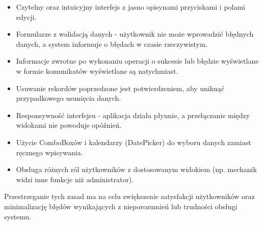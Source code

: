 \begin{itemize}
    \item Czytelny oraz intuicyjny interfejs z jasno opisynami przyciskami i polami edycji.
    \item Formularze z walidacją danych - użytkownik nie może wprowadzić błędnych danych, a system informuje o błędach w czasie rzeczywistym.
    \item Informacje zwrotne po wykonaniu operacji o sukcesie lub błędzie wyświetlane w formie komunikatów wyświetlane są natychmiast.
    \item Usuwanie rekordów poprzedzone jest potwierdzeniem, aby uniknąć przypadkowego usunięcia danych.
    \item Responsywność interfejsu - aplikacja działa płynnie, a przełączanie między widokami nie powoduje opóźnień.
    \item Użycie ComboBoxów i kalendarzy (DatePicker) do wyboru danych zamiast ręcznego wpisywania.
    \item Obsługa różnych ról użytkowników z dostosowanym widokiem (np. mechanik widzi inne funkcje niż administrator).
\end{itemize}

Przestrzeganie tych zasad ma na celu zwiększenie satysfakcji użytkowników oraz minimalizację błędów wynikających z nieporozumień lub trudności obsługi systemu.

